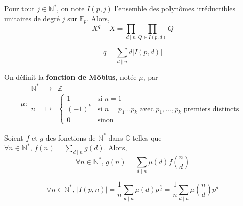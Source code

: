   \begin{theorem}
    Pour tout $j \in \mathbb{N}^*$, on note $I(p,j)$ l'ensemble des polynômes irréductibles unitaires de degré $j$ sur $\mathbb{F}_p$. Alors,
    \[ X^q - X = \prod_{d \mid n} \prod_{Q \in I(p,d)} Q \]
  \end{theorem}

  \begin{corollary}
    \[ q = \sum_{d \mid n} d \vert I(p,d) \vert \]
  \end{corollary}

  \begin{definition}
    On définit la \textbf{fonction de Möbius}, notée $\mu$, par
    \[
      \mu :
      \begin{array}{ccc}
        \mathbb{N}^* &\rightarrow& \mathbb{Z} \\
        n &\mapsto& \begin{cases}
          1 &\text{si } n = 1 \\
          (-1)^k &\text{si } n = p_1 \dots p_k \text{ avec } p_1, \dots, p_k \text{ premiers distincts} \\
          0 &\text{sinon}
        \end{cases}
      \end{array}
    \]
  \end{definition}

  \begin{theorem}
    Soient $f$ et $g$ des fonctions de $\mathbb{N}^*$ dans $\mathbb{C}$ telles que $\forall n \in \mathbb{N}^*, \, f(n) = \sum_{d \mid n} g(d)$. Alors,
    \[ \forall n \in \mathbb{N}^*, \, g(n) = \sum_{d \mid n} \mu(d) f \left( \frac{n}{d} \right) \]
  \end{theorem}

  \begin{corollary}
    \[ \forall n \in \mathbb{N}^*, \, \vert I(p,n) \vert = \frac{1}{n} \sum_{d \mid n} \mu(d) p^{\frac{n}{d}} = \frac{1}{n} \sum_{d \mid n} \mu \left( \frac{n}{d} \right) p^{d} \]
  \end{corollary}

